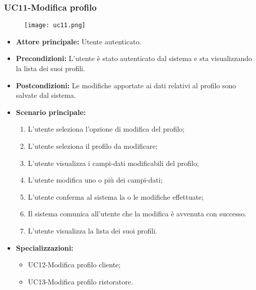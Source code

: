 \subsubsection{UC11-Modifica profilo }
\begin{figure}[h] \texttt{[image: uc11.png]} \end{figure}
\begin{itemize}
\item \textbf{Attore principale:} Utente autenticato.
\item \textbf{Precondizioni:} L'utente è stato autenticato dal sistema e sta visualizzando la lista dei suoi profili.
\item \textbf{Postcondizioni:} Le modifiche apportate ai dati relativi al profilo sono salvate dal sistema.
\item \textbf{Scenario principale:}
\begin{enumerate}
    \item L'utente seleziona l'opzione di modifica del profilo;
    \item L'utente seleziona il profilo da modificare;
    \item L'utente visualizza i campi-dati modificabili del profilo;
    \item L'utente modifica uno o più dei campi-dati;
    \item L'utente conferma al sistema la o le modifiche effettuate;
    \item Il sistema comunica all'utente che la modifica è avvenuta con successo.
    \item L'utente visualizza la lista dei suoi profili.
\end{enumerate}
    \item \textbf{Specializzazioni:}
        \begin{itemize}
            \item UC12-Modifica profilo cliente;
            \item UC13-Modifica profilo ristoratore.
        \end{itemize}
\end{itemize}

